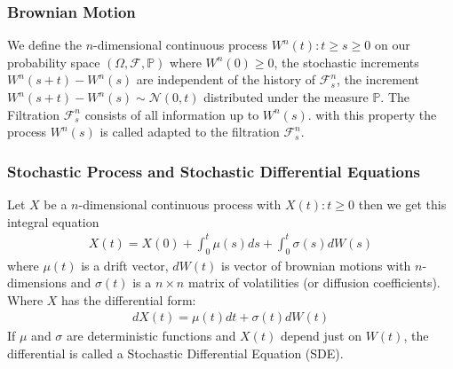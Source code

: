 \documentclass[11pt]{article}
\numberwithin{equation}{subsection}
\begin{document}
\subsubsection{Brownian Motion}		
We define the \(n\)-dimensional continuous process \(W^{n}(t): t\geq s\geq 0\) on our probability space \((\Omega, \mathcal{F}, \mathbb{P})\) where \(W^n(0) \geq 0\), the stochastic increments \(W^{n}(s+t)-W^{n}(s)\) are independent of the history of \(\mathcal{F}_s^{n}\), the increment \(W^{n}(s+t)-W^{n}(s) \sim \mathcal{N}(0, t)\) distributed under the measure \(\mathbb{P}\). The Filtration \(\mathcal{F}_s^n\) consists of all information up to \(W^n(s)\). with this property the process \(W^{n}(s)\) is called adapted to the filtration \(\mathcal{F}_s^n\).
\subsubsection{Stochastic Process and Stochastic Differential Equations}
Let \(X\) be a \(n\)-dimensional continuous process with \(X(t): t \geq 0\) then we get this integral equation
\begin{eqnarray*}
	X(t) = X(0) + \int_{0}^{t} \mu(s)ds + \int_{0}^{t} \sigma(s) dW(s)
\end{eqnarray*}	
where \(\mu(t)\) is a drift vector, \(dW(t)\) is vector of brownian motions with \(n\)-dimensions and \(\sigma(t)\) is a \(n\times n\) matrix of volatilities (or diffusion coefficients). Where \(X\) has the differential form:
\begin{eqnarray*}
	dX(t) = \mu(t)dt + \sigma(t) dW(t)
\end{eqnarray*}	
If \(\mu\) and \(\sigma\) are deterministic functions and \(X(t)\) depend just on \(W(t)\), the differential is called a Stochastic Differential Equation (SDE).
\end{document}
